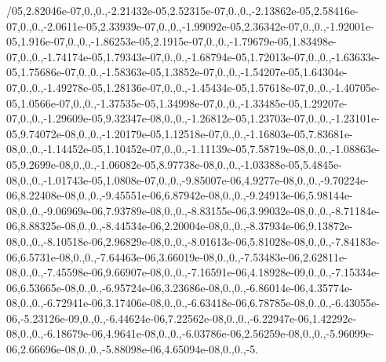 {/05,2.\-82046e-\/07,0.,0.,-\/2.\-21432e-\/05,2.\-52315e-\/07,0.,0.,-\/2.\-13862e-\/05,2.\-58416e-\/07,0.,0.,-\/2.\-0611e-\/05,2.\-33939e-\/07,0.,0.,-\/1.\-99092e-\/05,2.\-36342e-\/07,0.,0.,-\/1.\-92001e-\/05,1.\-916e-\/07,0.,0.,-\/1.\-86253e-\/05,2.\-1915e-\/07,0.,0.,-\/1.\-79679e-\/05,1.\-83498e-\/07,0.,0.,-\/1.\-74174e-\/05,1.\-79343e-\/07,0.,0.,-\/1.\-68794e-\/05,1.\-72013e-\/07,0.,0.,-\/1.\-63633e-\/05,1.\-75686e-\/07,0.,0.,-\/1.\-58363e-\/05,1.\-3852e-\/07,0.,0.,-\/1.\-54207e-\/05,1.\-64304e-\/07,0.,0.,-\/1.\-49278e-\/05,1.\-28136e-\/07,0.,0.,-\/1.\-45434e-\/05,1.\-57618e-\/07,0.,0.,-\/1.\-40705e-\/05,1.\-0566e-\/07,0.,0.,-\/1.\-37535e-\/05,1.\-34998e-\/07,0.,0.,-\/1.\-33485e-\/05,1.\-29207e-\/07,0.,0.,-\/1.\-29609e-\/05,9.\-32347e-\/08,0.,0.,-\/1.\-26812e-\/05,1.\-23703e-\/07,0.,0.,-\/1.\-23101e-\/05,9.\-74072e-\/08,0.,0.,-\/1.\-20179e-\/05,1.\-12518e-\/07,0.,0.,-\/1.\-16803e-\/05,7.\-83681e-\/08,0.,0.,-\/1.\-14452e-\/05,1.\-10452e-\/07,0.,0.,-\/1.\-11139e-\/05,7.\-58719e-\/08,0.,0.,-\/1.\-08863e-\/05,9.\-2699e-\/08,0.,0.,-\/1.\-06082e-\/05,8.\-97738e-\/08,0.,0.,-\/1.\-03388e-\/05,5.\-4845e-\/08,0.,0.,-\/1.\-01743e-\/05,1.\-0808e-\/07,0.,0.,-\/9.\-85007e-\/06,4.\-9277e-\/08,0.,0.,-\/9.\-70224e-\/06,8.\-22408e-\/08,0.,0.,-\/9.\-45551e-\/06,6.\-87942e-\/08,0.,0.,-\/9.\-24913e-\/06,5.\-98144e-\/08,0.,0.,-\/9.\-06969e-\/06,7.\-93789e-\/08,0.,0.,-\/8.\-83155e-\/06,3.\-99032e-\/08,0.,0.,-\/8.\-71184e-\/06,8.\-88325e-\/08,0.,0.,-\/8.\-44534e-\/06,2.\-20004e-\/08,0.,0.,-\/8.\-37934e-\/06,9.\-13872e-\/08,0.,0.,-\/8.\-10518e-\/06,2.\-96829e-\/08,0.,0.,-\/8.\-01613e-\/06,5.\-81028e-\/08,0.,0.,-\/7.\-84183e-\/06,6.\-5731e-\/08,0.,0.,-\/7.\-64463e-\/06,3.\-66019e-\/08,0.,0.,-\/7.\-53483e-\/06,2.\-62811e-\/08,0.,0.,-\/7.\-45598e-\/06,9.\-66907e-\/08,0.,0.,-\/7.\-16591e-\/06,4.\-18928e-\/09,0.,0.,-\/7.\-15334e-\/06,6.\-53665e-\/08,0.,0.,-\/6.\-95724e-\/06,3.\-23686e-\/08,0.,0.,-\/6.\-86014e-\/06,4.\-35774e-\/08,0.,0.,-\/6.\-72941e-\/06,3.\-17406e-\/08,0.,0.,-\/6.\-63418e-\/06,6.\-78785e-\/08,0.,0.,-\/6.\-43055e-\/06,-\/5.\-23126e-\/09,0.,0.,-\/6.\-44624e-\/06,7.\-22562e-\/08,0.,0.,-\/6.\-22947e-\/06,1.\-42292e-\/08,0.,0.,-\/6.\-18679e-\/06,4.\-9641e-\/08,0.,0.,-\/6.\-03786e-\/06,2.\-56259e-\/08,0.,0.,-\/5.\-96099e-\/06,2.\-66696e-\/08,0.,0.,-\/5.\-88098e-\/06,4.\-65094e-\/08,0.,0.,-\/5.}
